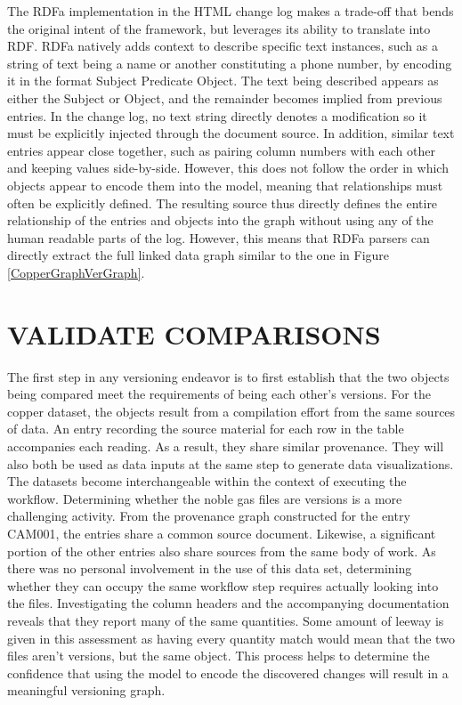 The RDFa implementation in the HTML change log makes a trade-off that bends the original intent of the framework, but leverages its ability to translate into RDF.
RDFa natively adds context to describe specific text instances, such as a string of text being a name or another constituting a phone number, by encoding it in the format Subject Predicate Object.
The text being described appears as either the Subject or Object, and the remainder becomes implied from previous entries.
In the change log, no text string directly denotes a modification so it must be explicitly injected through the document source.
In addition, similar text entries appear close together, such as pairing column numbers with each other and keeping values side-by-side.
However, this does not follow the order in which objects appear to encode them into the model, meaning that relationships must often be explicitly defined.
The resulting source thus directly defines the entire relationship of the entries and objects into the graph without using any of the human readable parts of the log.
However, this means that RDFa parsers can directly extract the full linked data graph similar to the one in Figure \ref{CopperGraphVerGraph}.

\section{VALIDATE COMPARISONS}

The first step in any versioning endeavor is to first establish that the two objects being compared meet the requirements of being each other's versions.
For the copper dataset, the objects result from a compilation effort from the same sources of data.
An entry recording the source material for each row in the table accompanies each reading.
As a result, they share similar provenance.
They will also both be used as data inputs at the same step to generate data visualizations.
The datasets become interchangeable within the context of executing the workflow.
Determining whether the noble gas files are versions is a more challenging activity.
From the provenance graph constructed for the entry CAM001, the entries share a common source document.
Likewise, a significant portion of the other entries also share sources from the same body of work.
As there was no personal involvement in the use of this data set, determining whether they can occupy the same workflow step requires actually looking into the files.
Investigating the column headers and the accompanying documentation reveals that they report many of the same quantities.
Some amount of leeway is given in this assessment as having every quantity match would mean that the two files aren't versions, but the same object.
This process helps to determine the confidence that using the model to encode the discovered changes will result in a meaningful versioning graph.

